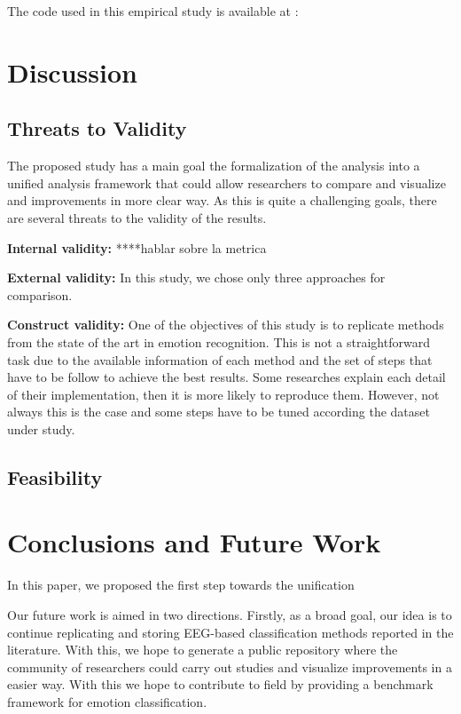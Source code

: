 \documentclass{sig-alternate}
\begin{document}
The code used in this empirical study is available at : 

\section{Discussion}
\label{discussion}

\subsection{Threats to Validity}

The proposed  study has a main goal the formalization
of the analysis into a unified analysis framework 
that could allow researchers to compare and
visualize and improvements in more clear way. 
As this is quite a challenging goals, there are several
threats to the validity of the results. 

\textbf{Internal validity: }  ****hablar sobre la metrica

\textbf{External validity: } In this study, we chose only three approaches
for comparison. 

\textbf{Construct validity: } One of the objectives of this study is 
to replicate methods from the state of the art in emotion recognition.
This is not a straightforward task due to the available information of each method 
and the set of steps that have to be follow to achieve the best results.
Some researches explain each detail of their implementation, then it is more 
likely to reproduce them. However, not always this is the case and some steps 
have to be tuned according the dataset under study.    


\subsection{Feasibility}


\section{Conclusions and  Future Work}
\label{conclusion}

In this paper, we proposed the first step towards the unification 


Our future work is aimed in two directions. Firstly, as a broad
goal, our idea is to continue replicating and  storing EEG-based 
classification methods reported in the literature. With this, we hope
to generate a public repository where the community of researchers
could carry out studies and visualize improvements in  a easier way. 
With this we hope to contribute to field by providing a benchmark
framework for emotion classification.
\end{document}
